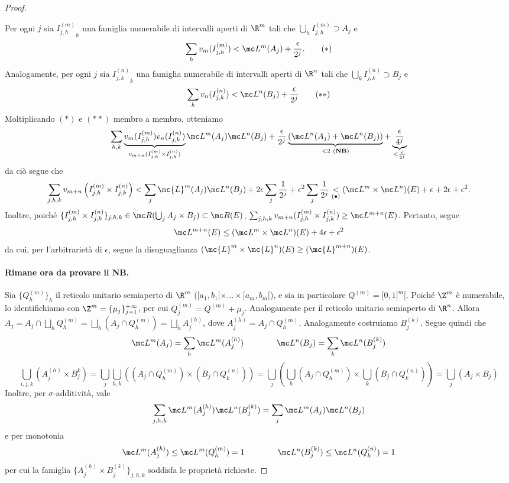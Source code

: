 \begin{proof}
\begin{itemize}
        Per ogni $j$ sia ${I_{j,h}^{(m)}}_h$ una famiglia numerabile di intervalli aperti di $\R^m$ tali che $\bigcup_{h}I_{j,h}^{(m)} \supset A_j$ e 
        \[\sum_hv_m(I_{j,h}^{(m)})<\mc L^m(A_j)+\frac{\epsilon}{2^j}.\tag{$\ast$}\]
        Analogamente, per ogni $j$ sia ${I_{j,k}^{(n)}}_k$ una famiglia numerabile di intervalli aperti di $\R^n$ tali che $\bigcup_{k}I_{j,k}^{(n)} \supset B_j$ e 
        \[\sum_kv_n(I_{j,k}^{(n)})<\mc L^n(B_j)+\frac{\epsilon}{2^j}\tag{$\ast\ast$}\]
        Moltiplicando $(*)$ e $(**)$ membro a membro, otteniamo
        \[\sum_{h,k}\underbrace{v_m(I_{j,h}^{(m)})v_n(I_{j,k}^{(n)})}_{v_{m+n}(I_{j,h}^{(m)}\times I_{j,k}^{(n)})}\mc L^m(A_j)\mc L^n(B_j)  +\frac{\epsilon}{2^j}\underbrace{\left( \mc L^n(A_j) + \mc L^n(B_j) \right)}_{<2\ (\textbf{NB})}+\underbrace{\frac{\epsilon}{4^j}}_{<\frac{\epsilon}{2^j}}\]
        da ciò segue che 
        \[\sum_{j,h,k}v_{m+n}\left( I_{j,h}^{(m)} \times I_{j,k}^{(n)} \right)<\sum_j\mc{L}^m(A_j)\mc L^n(B_j)+ 2\epsilon \sum_j\frac{1}{2^j}+ \epsilon^2\sum_j\frac{1}{2^j} \underset{(\bullet)}{<} (\mc L^m \times \mc L^n)(E)+\epsilon+ 2\epsilon + \epsilon ^2.\]
        Inoltre, poiché $\{I_{j,h}^{(m)}\times I_{j,k}^{(n)}\}_{j,h,k}\in \mc R(\bigcup_jA_j\times B_j)\subset \mc R(E)$, $\sum_{j,h,k}v_{m+n}(I_{j,h}^{(m)}\times I_{j,k}^{(n)})\geq \mc L^{m+n}(E)$. Pertanto, segue 
        \[\mc L^{m+n}(E)\leq (\mc L^m \times \mc L^n)(E)+4\epsilon + \epsilon^2\]
        da cui, per l'arbitrarietà di $\epsilon$, segue la disuguaglianza $(\mc{L}^{m} \times \mc{L}^{n})(E)\geq(\mc{L}^{m+n})(E)$.
    \end{itemize}
    \paragraph{Rimane ora da provare il NB.} Sia $\{Q^{(m)}_h\}_h$ il reticolo unitario semiaperto di $\R^m$ ($[a_1,b_1[\times \dots \times [a_m,b_m[$), e sia in particolare $Q^{(m)}=[0,1[^m[$. Poiché $\Z^m$ è numerabile, lo identifichiamo con $\Z^m= \{\mu_j\}_{j=1}^{+\infty}$, per cui $Q^{(m)}_j= Q^{(m)}+\mu_j$. Analogamente per il reticolo unitario semiaperto di $\R^n$. Allora $A_j = A_j \cap \bigsqcup_hQ_h^{(m)} = \bigsqcup_h (A_j\cap Q^{(m)}_h) = \bigsqcup_h A_j^{(h)}$, dove $A_j^{(h)} = A_j\cap Q^{(m)}_h$. Analogamente costruiamo $B_j^{(k)}$. Segue quindi che 
    \[\mc L^m(A_j) = \sum_h\mc L^m(A_j^{(h)})\qquad \qquad  \mc L^n(B_j) = \sum_k\mc L^n(B_j^{(k)})\]
    \[\bigcup_{i,j,k}(A_j^{(h)}\times B_j^{k}) = \bigcup_{j}\bigcup_{h,k}\left( (A_j\cap Q_h^{(m)}) \times (B_j\cap Q_k^{(n)})\right) = \bigcup_{j}\left( \bigcup_{h}(A_j\cap Q_h^{(m)}) \times \bigcup_{k}(B_j\cap Q_k^{(n)})\right) = \bigcup_j(A_j\times B_j)\]
    Inoltre, per $\sigma$-additività, vale 
    \[\sum_{j,h,k}\mc L^m(A_j^{(h)})\mc L^n(B_j^{(k)}) = \sum_j\mc L^m(A_j)\mc L^n(B_j)\]
    e per monotonia
    \[\mc L^m(A_j^{(h)}) \leq \mc L^m(Q^{(m)}_h) = 1\qquad \qquad  \mc L^n(B_j^{(k)})\leq \mc L^n(Q^{(n)}_k) = 1\]
    per cui la famiglia $\{A_j^{(h)}\times B_j^{(k)}\}_{j,h,k}$ soddisfa le proprietà richieste. \qedhere
\end{proof}

